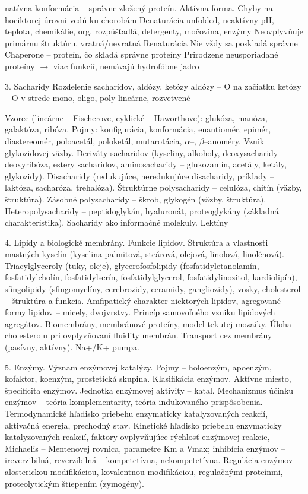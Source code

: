 natívna konformácia -- správne zložený proteín. Aktívna forma. Chyby na hociktorej úrovni vedú ku chorobám
Denaturácia
unfolded, neaktívny
pH, teplota, chemikálie, org. rozpúšťadlá, detergenty, močovina, enzýmy
Neovplyvňuje primárnu štruktúru.
vratná/nevratná
Renaturácia
    Nie vždy sa poskladá správne
Chaperone -- proteín, čo skladá správne proteíny
Prirodzene neusporiadané proteíny $\rightarrow$ viac funkcií, nemávajú hydrofóbne jadro

3. Sacharidy
Rozdelenie sacharidov, aldózy, ketózy
aldózy -- O na začiatku
ketózy -- O v strede
mono, oligo, poly
lineárne, rozvetvené

Vzorce (lineárne -- Fischerove, cyklické -- Haworthove): glukóza, manóza, galaktóza, ribóza. Pojmy: konfigurácia, konformácia, enantiomér, epimér, diastereomér, poloacetál, poloketál, mutarotácia, $\alpha$--, $\beta$--anoméry. Vznik glykozidovej väzby. Deriváty sacharidov (kyseliny, alkoholy, deoxysacharidy -- deoxyribóza, estery sacharidov, aminosacharidy -- glukozamín, acetály, ketály, glykozidy). Disacharidy (redukujúce, neredukujúce disacharidy, príklady -- laktóza, sacharóza, trehalóza). Štruktúrne polysacharidy -- celulóza, chitín
(väzby, štruktúra). Zásobné polysacharidy -- škrob, glykogén (väzby, štruktúra).
Heteropolysacharidy -- peptidoglykán, hyaluronát, proteoglykány (základná charakteristika). Sacharidy ako informačné molekuly. Lektíny

4. Lipidy a biologické membrány. Funkcie lipidov. Štruktúra a vlastnosti mastných kyselín (kyselina palmitová, steárová, olejová, linolová, linolénová). Triacylglyceroly (tuky, oleje), glycerofosfolipidy (fosfatidyletanolamín, fosfatidylcholín, fosfatidylserín, fosfatidylglycerol, fosfatidylinozitol, kardiolipín), sfingolipidy (sfingomyelíny, cerebrozidy, ceramidy, gangliozidy), vosky, cholesterol -- štruktúra a funkcia. Amfipatický charakter niektorých lipidov, agregované formy lipidov -- micely,
dvojvrstvy. Princíp samovoľného vzniku lipidových agregátov. Biomembrány, membránové proteíny, model tekutej mozaiky. Úloha cholesterolu pri ovplyvňovaní fluidity membrán. Transport cez membrány (pasívny, aktívny). Na+/K+ pumpa.

5. Enzýmy. Význam enzýmovej katalýzy. Pojmy -- holoenzým, apoenzým, kofaktor, koenzým, prostetická skupina. Klasifikácia enzýmov. Aktívne miesto, špecificita enzýmov. Jednotka enzýmovej aktivity -- katal. Mechanizmus účinku enzýmov -- teória komplementarity, teória indukovaného prispôsobenia. Termodynamické hľadisko priebehu enzymaticky katalyzovaných reakcií, aktivačná energia, prechodný stav. Kinetické hľadisko priebehu enzymaticky katalyzovaných reakcií, faktory ovplyvňujúce rýchlosť enzýmovej reakcie, Michaelis -- Mentenovej
rovnica, parametre Km a Vmax; inhibícia enzýmov -- ireverzibilná, reverzibilná -- kompetetívna, nekompetetívna. Regulácia enzýmov -- alosterickou modifikáciou, kovalentnou modifikáciou, regulačnými proteínmi, proteolytickým štiepením (zymogény).

